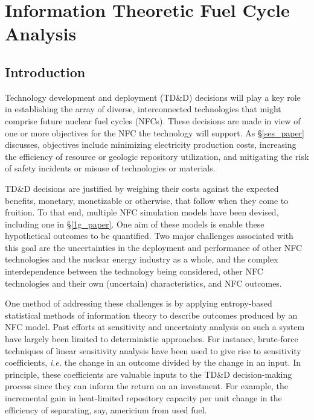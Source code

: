 \chapter{Information Theoretic Fuel Cycle Analysis}
\label{cts_paper}



\section{Introduction}
\label{cts_sec:intro}

Technology development and deployment (TD\&D) decisions will play a key role in
establishing the array of diverse, interconnected technologies that might comprise
future nuclear fuel cycles (NFCs).  These decisions are made in view of one or more
objectives for the NFC the technology will support.  As \S \ref{ses_paper} discusses,  
objectives include minimizing
electricity production costs, increasing the efficiency of resource or geologic
repository utilization, and mitigating the risk of safety incidents or misuse of
technologies or materials.

TD\&D decisions are justified by weighing their costs against the expected benefits,
monetary, monetizable or otherwise, that follow when they come to fruition.  To that
end, multiple NFC simulation models  \cite{Jacobson2009, GENIUS1} have been devised, 
including one in \S \ref{1g_paper}.  
One aim of these models is enable these hypothetical outcomes to be quantified.  Two major 
challenges associated with this goal are the uncertainties in the deployment and performance 
of other NFC technologies and the nuclear energy industry as a whole, and the complex 
interdependence between the technology being considered, other NFC technologies and their 
own (uncertain) characteristics, and NFC outcomes.

One method of addressing these challenges is by applying entropy-based statistical methods of information
theory to describe outcomes produced by an NFC model.  Past efforts at sensitivity and uncertainty
analysis on such a system have largely been limited to deterministic approaches.  For instance,
brute-force techniques of linear sensitivity analysis have been used to give rise to sensitivity
coefficients, \emph{i.e.} the change in an outcome divided by the change in an input.  In principle, these
coefficients are valuable inputs to the TD\&D decision-making process since they can inform the
return on an investment.  For example, the incremental gain in heat-limited repository capacity per
unit change in the efficiency of separating, say, americium from used fuel.

